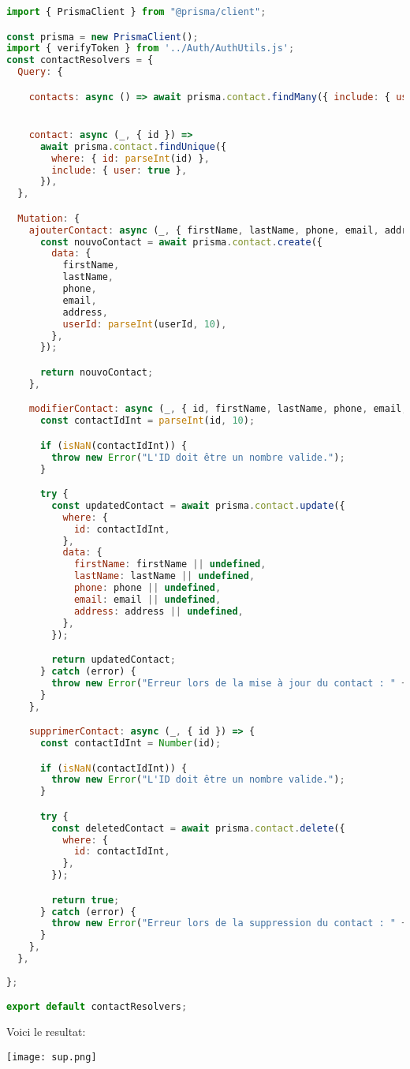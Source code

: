 \documentclass{article}
\begin{document}
\begin{lstlisting}[language=JavaScript]
import { PrismaClient } from "@prisma/client";

const prisma = new PrismaClient();
import { verifyToken } from '../Auth/AuthUtils.js'; 
const contactResolvers = {
  Query: {

    contacts: async () => await prisma.contact.findMany({ include: { user: true } }),


    contact: async (_, { id }) =>
      await prisma.contact.findUnique({
        where: { id: parseInt(id) },
        include: { user: true },
      }),
  },

  Mutation: {
    ajouterContact: async (_, { firstName, lastName, phone, email, address, userId }) => {
      const nouvoContact = await prisma.contact.create({
        data: {
          firstName,
          lastName,
          phone,
          email,
          address,
          userId: parseInt(userId, 10),
        },
      });

      return nouvoContact;
    },

    modifierContact: async (_, { id, firstName, lastName, phone, email, address }) => {
      const contactIdInt = parseInt(id, 10);

      if (isNaN(contactIdInt)) {
        throw new Error("L'ID doit être un nombre valide.");
      }

      try {
        const updatedContact = await prisma.contact.update({
          where: {
            id: contactIdInt,
          },
          data: {
            firstName: firstName || undefined,
            lastName: lastName || undefined,
            phone: phone || undefined,
            email: email || undefined,
            address: address || undefined,
          },
        });

        return updatedContact;
      } catch (error) {
        throw new Error("Erreur lors de la mise à jour du contact : " + error.message);
      }
    },

    supprimerContact: async (_, { id }) => {
      const contactIdInt = Number(id);

      if (isNaN(contactIdInt)) {
        throw new Error("L'ID doit être un nombre valide.");
      }

      try {
        const deletedContact = await prisma.contact.delete({
          where: {
            id: contactIdInt,
          },
        });

        return true;
      } catch (error) {
        throw new Error("Erreur lors de la suppression du contact : " + error.message);
      }
    },
  },
 
};

export default contactResolvers;

    \end{lstlisting}
    Voici le resultat:
    \begin{center} 
    \texttt{[image: sup.png]} 
\end{center}
    \vspace{1cm}
   
\end{document}
